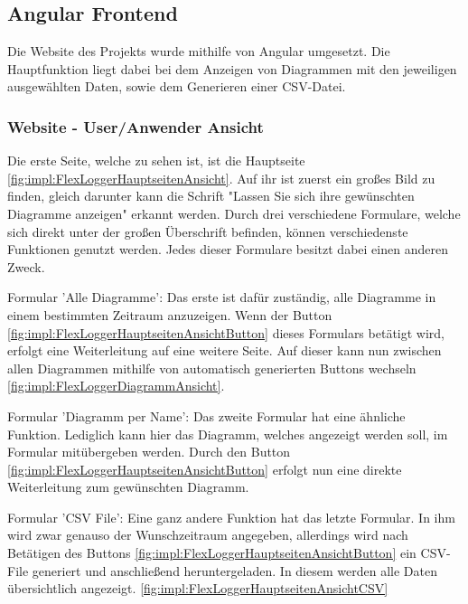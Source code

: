 \subsection{Angular Frontend}
Die Website des Projekts wurde mithilfe von Angular umgesetzt. Die Hauptfunktion liegt dabei bei dem Anzeigen von Diagrammen mit den jeweiligen ausgewählten Daten, sowie dem Generieren einer CSV-Datei.
 
 
\subsubsection{Website - User/Anwender Ansicht}
Die erste Seite, welche zu sehen ist, ist die Hauptseite \ref{fig:impl:FlexLoggerHauptseitenAnsicht}. Auf ihr ist zuerst ein großes Bild zu finden, gleich darunter kann die Schrift "Lassen Sie sich ihre gewünschten Diagramme anzeigen" erkannt werden.
Durch drei verschiedene Formulare, welche sich direkt unter der großen Überschrift befinden, können verschiedenste Funktionen genutzt werden. Jedes dieser Formulare besitzt dabei einen anderen Zweck.
 
\begin{compactitem}
    \item Formular 'Alle Diagramme': Das erste ist dafür zuständig, alle Diagramme in einem bestimmten Zeitraum anzuzeigen. Wenn der Button \ref{fig:impl:FlexLoggerHauptseitenAnsichtButton} dieses Formulars betätigt wird, erfolgt eine Weiterleitung auf eine weitere Seite. Auf dieser kann nun zwischen allen Diagrammen mithilfe von automatisch generierten Buttons wechseln \ref{fig:impl:FlexLoggerDiagrammAnsicht}.
    \item Formular 'Diagramm per Name': Das zweite Formular hat eine ähnliche Funktion. Lediglich kann hier das Diagramm, welches angezeigt werden soll, im Formular mitübergeben werden. Durch den Button \ref{fig:impl:FlexLoggerHauptseitenAnsichtButton} erfolgt nun eine direkte Weiterleitung zum gewünschten Diagramm.
    \item Formular 'CSV File': Eine ganz andere Funktion hat das letzte Formular. In ihm wird zwar genauso der Wunschzeitraum angegeben, allerdings wird nach Betätigen des Buttons \ref{fig:impl:FlexLoggerHauptseitenAnsichtButton} ein CSV-File generiert und anschließend heruntergeladen. In diesem werden alle Daten übersichtlich angezeigt. \ref{fig:impl:FlexLoggerHauptseitenAnsichtCSV}
\end{compactitem}

